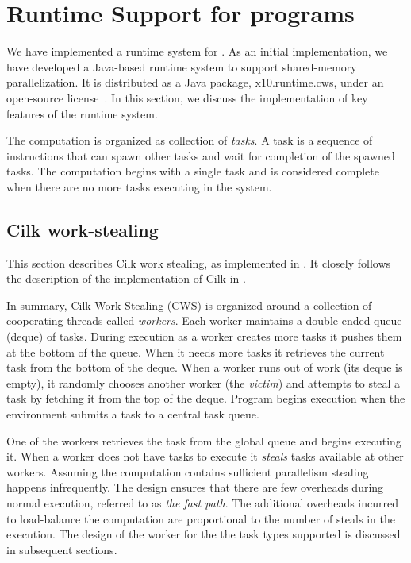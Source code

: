 \section{Runtime Support for \Xten{} programs}
\label{s:runtime}

We have implemented a runtime system for \Xten{}. 
As an initial implementation, we have developed a Java-based
runtime system to support shared-memory parallelization. It is
distributed as a Java package, {\java x10.runtime.cws}, under an
open-source license~\cite{x10-webpage}. In this section, we discuss the
implementation of key features of the runtime system.

The computation is organized as collection of {\em tasks}. A task is a
sequence of instructions that can spawn other tasks and wait for
completion of the spawned tasks. The computation begins with a single
task and is considered complete when there are no more tasks executing
in the system. 

\subsection{Cilk work-stealing}
This section describes Cilk work stealing, as implemented in \XWS. It
closely follows the description of the implementation of Cilk in
\cite{frigo98implementation}.

In summary, Cilk Work Stealing (CWS) is organized around a collection
of cooperating threads called {\em workers}. Each worker maintains a
double-ended queue (deque) of tasks. During execution as a worker
creates more tasks it pushes them at the bottom of the queue. When it
needs more tasks it retrieves the current task from the bottom of the
deque. When a worker runs out of work (its deque is empty), it
randomly chooses another worker (the {\em victim}) and attempts to
steal a task by fetching it from the top of the deque. Program begins
execution when the environment submits a task to a central task queue.

One of the workers retrieves the task from the global queue and begins
executing it. When a worker does not have tasks to execute it {\em steals}
tasks available at other workers. Assuming the computation contains
sufficient parallelism stealing happens infrequently. The design
ensures that there are few overheads during normal execution, referred
to as {\em the fast path}. The additional overheads incurred to load-balance
the computation are proportional to the number of steals in the
execution. The design of the worker for the the task types supported
is discussed in subsequent sections.

